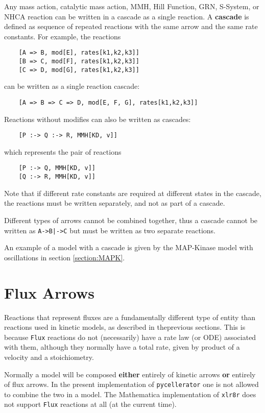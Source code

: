 Any mass action, catalytic mass action, MMH, Hill Function, GRN, S-System, or NHCA reaction can be written in a cascade as a single reaction. A \textbf{cascade} is defined as sequence of repeated reactions with the same arrow and the same rate constants. For example, the reactions
\begin{verbatim}
    [A => B, mod[E], rates[k1,k2,k3]]
    [B => C, mod[F], rates[k1,k2,k3]]
    [C => D, mod[G], rates[k1,k2,k3]]
\end{verbatim}
can be written as a single reaction cascade:
\begin{verbatim}
    [A => B => C => D, mod[E, F, G], rates[k1,k2,k3]] 
\end{verbatim}
Reactions without modifies can also be written as cascades:
\begin{verbatim}
    [P :-> Q :-> R, MMH[KD, v]]
\end{verbatim}
which represents the pair of reactions 
\begin{verbatim}
    [P :-> Q, MMH[KD, v]]
    [Q :-> R, MMH[KD, v]]
\end{verbatim}
Note that if different rate constants are required at different states in the cascade, the reactions must be written separately, and not as part of a cascade.

Different types of arrows cannot be combined together, thus a cascade cannot be written as \verb.A->B|->C. but must be written as two separate reactions. 

An example of a model with a cascade is given by the MAP-Kinase model with oscillations in section \ref{section:MAPK}. 


\section{Flux Arrows}
Reactions that represent fluxes are a fundamentally different type of entity than reactions used in kinetic models, as described in theprevious sections. This is because {\tt Flux} reactions do not (necessarily) have a rate law (or ODE) associated with them, although they normally have a total rate, given by product of a velocity and a stoichiometry. 

Normally a model will be composed \textbf{either} entirely of kinetic arrows \textbf{or} entirely of flux arrows. In the present implementation of {\tt pycellerator} one is not allowed to combine the two in a model.  The Mathematica implementation of {\tt xlr8r} does not support {\tt Flux} reactions at all (at the current time). 

